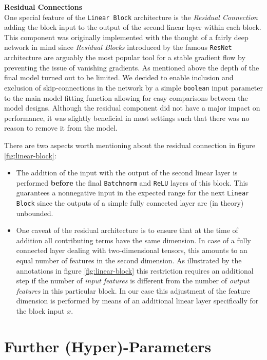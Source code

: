 \documentclass[12pt, letterpaper]{article}
\begin{document}
\textbf{Residual Connections} \\
One special feature of the \texttt{Linear Block} architecture is the \emph{Residual Connection} adding the block input to the output of the second linear layer within each block.
This component was originally implemented with the thought of a fairly deep network in mind since \emph{Residual Blocks} introduced by the famous \texttt{ResNet} architecture are arguably the most popular tool for a stable gradient flow by preventing the issue of vanishing gradients.
As mentioned above the depth of the final model turned out to be limited.
We decided to enable inclusion and exclusion of skip-connections in the network by a simple \texttt{boolean} input parameter to the main model fitting function allowing for easy comparisons between the model designs.
Although the residual component did not have a major impact on performance, it was slightly beneficial in most settings such that there was no reason to remove it from the model.

There are two aspects worth mentioning about the residual connection in figure \ref{fig:linear-block}:
\begin{itemize}
    \item The addition of the input with the output of the second linear layer is performed \textbf{before} the final \texttt{Batchnorm} and \texttt{ReLU} layers of this block.
          This guarantees a nonnegative input in the expected range for the next \texttt{Linear Block} since the outputs of a simple fully connected layer are (in theory) unbounded.

    \item One caveat of the residual architecture is to ensure that at the time of addition all contributing terms have the same dimension.
          In case of a fully connected layer dealing with two-dimensional tensors, this amounts to an equal number of features in the second dimension.
          As illustrated by the annotations in figure \ref{fig:linear-block} this restriction requires an additional step if the number of \emph{input features} is different from the number of \emph{output features} in this particular block.
          In our case this adjustment of the feature dimension is performed by means of an additional linear layer specifically for the block input $x$.
\end{itemize}


\section{Further (Hyper)-Parameters}
\end{document}
